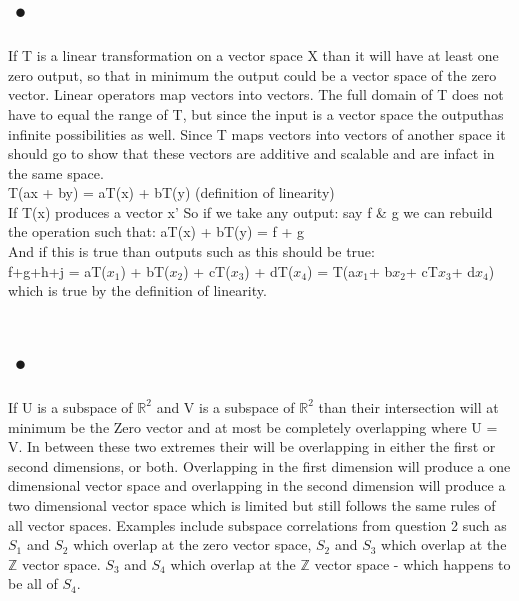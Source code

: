 \documentclass[12pt]{article}
\begin{document}
\section{•}

If T is a linear transformation on a vector space X than it will have at least one zero output, so that in minimum the output could be a vector space of the zero vector. Linear operators map vectors into vectors. The full domain of T does not have to equal the range of T, but since the input is a vector space the outputhas infinite possibilities as well. Since T maps vectors into vectors of another space it should go to show that these vectors are additive and scalable and are infact in the same space.\\
T(ax + by) = aT(x) + bT(y) (definition of linearity)\\
If T(x) produces a vector x'
So if we take any output: say f \& g we can rebuild the operation such that:
aT(x) + bT(y) = f + g\\
And if this is true than outputs such as this should be true:\\
f+g+h+j = aT($x_{1}$) + bT($x_{2}$) + cT($x_{3}$) + dT($x_{4}$) = T(a$x_{1}$+ b$x_{2}$+ cT$x_{3}$+ d$x_{4}$)\\ which is true by the definition of linearity.\\

\section{•}
If U is a subspace of $\mathbb{R}^{2}$ and V is a subspace of $\mathbb{R}^{2}$ than their intersection will at minimum be the Zero vector and at most be completely overlapping where U = V. In between these two extremes their will be overlapping in either the first or second dimensions, or both. Overlapping in the first dimension will produce a one dimensional vector space and overlapping in the second dimension will produce a two dimensional 
 vector space which is limited but still follows the same rules of all vector spaces. Examples include subspace correlations from question 2 such as $S_{1}$ and $S_{2}$ which overlap at the zero vector space, $S_{2}$ and $S_{3}$ which overlap at the $\mathbb{Z}$ vector space. $S_{3}$ and $S_{4}$ which overlap at the $\mathbb{Z}$ vector space - which happens to be all of $S_{4}$.
 
\end{document}
